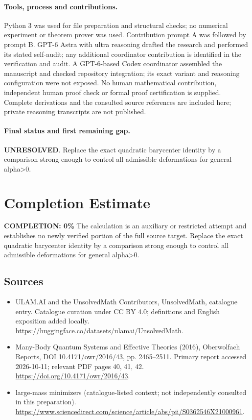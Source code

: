 \documentclass[11pt]{article}
\begin{document}
\paragraph{Tools, process and contributions.}
Python 3 was used for file preparation and structural checks; no numerical experiment or theorem prover was used. Contribution prompt A was followed by prompt B. GPT-6 Astra with ultra reasoning drafted the research and performed its stated self-audit; any additional coordinator contribution is identified in the verification and audit. A GPT-6-based Codex coordinator assembled the manuscript and checked repository integration; its exact variant and reasoning configuration were not exposed. No human mathematical contribution, independent human proof check or formal proof certification is supplied. Complete derivations and the consulted source references are included here; private reasoning transcripts are not published.

\paragraph{Final status and first remaining gap.}
\textbf{UNRESOLVED}. Replace the exact quadratic barycenter identity by a comparison strong enough to control all admissible deformations for general alpha>0.

\section{Completion Estimate}
\noindent\textbf{COMPLETION: 0\%}
The calculation is an auxiliary or restricted attempt and establishes no newly verified portion of the full source target. Replace the exact quadratic barycenter identity by a comparison strong enough to control all admissible deformations for general alpha>0.

\subsection{Sources}
\begin{itemize}
\item[\hypertarget{source:statement:1}{S1}] ULAM.AI and the UnsolvedMath Contributors, UnsolvedMath, catalogue entry. Catalogue curation under CC BY 4.0; definitions and English exposition added locally.
\url{https://huggingface.co/datasets/ulamai/UnsolvedMath}.
\item[\hypertarget{source:statement:2}{S2}] Many-Body Quantum Systems and Effective Theories (2016), Oberwolfach Reports, DOI 10.4171/owr/2016/43, pp. 2465--2511. Primary report accessed 2026-10-11; relevant PDF pages 40, 41, 42.
\url{https://doi.org/10.4171/owr/2016/43}.
\item[\hypertarget{source:statement:3}{S3}] large-mass minimizers (catalogue-listed context; not independently consulted in this preparation).
\url{https://www.sciencedirect.com/science/article/abs/pii/S0362546X21000961}.
\end{itemize}
\label{end:statement}
\end{document}
